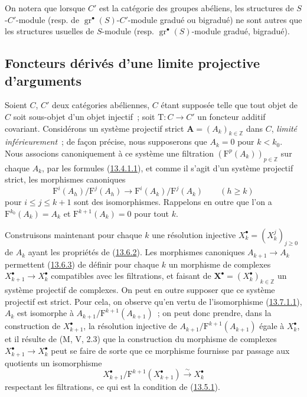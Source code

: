 \begin{env}[13.6.6]
On notera que lorsque $C'$ est la catégorie des groupes abéliens, les
structures de $S$-$C'$-module (resp. de
$\operatorname{gr}^\bullet(S)$-$C'$-module gradué ou bigradué) ne sont
autres que les structures usuelles de $S$-module (resp.
$\operatorname{gr}^\bullet(S)$-module gradué, bigradué).
\end{env}

\subsection{Foncteurs dérivés d'une limite projective d'arguments}
\label{subsection:0.13.7-fr}

\begin{env}[13.7.1]
\label{0.13.7.1-fr}
Soient $C$, $C'$ deux catégories abéliennes, $C$ étant supposée telle
que tout objet de $C$ soit sous-objet d'un objet injectif~; soit
$\mathrm T:C\to C'$ un foncteur additif covariant. Considérons un
système projectif strict $\mathbf A=(A_k)_{k\in\mathbb Z}$ dans $C$,
\emph{limité inférieurement}~; de façon précise, nous supposerons que
$A_k=0$ pour $k<k_0$. Nous associons canoniquement à ce système une
filtration $(\mathrm F^p(A_k))_{p\in\mathbb Z}$ sur chaque $A_k$, par les
formules (\hyperref[0.13.4.1.1-fr]{13.4.1.1}), et comme il s'agit d'un
système projectif strict, les morphismes canoniques
\begin{equation}
\label{0.13.7.1.1-fr}
\tag{13.7.1.1}
\mathrm F^i(A_h)/\mathrm F^j(A_h)\to
\mathrm F^i(A_k)/\mathrm F^j(A_k)\qquad(h\geq k)
\end{equation}
pour $i\leq j\leq k+1$ sont des isomorphismes. Rappelons en outre que
l'on a $\mathrm F^{k_0}(A_k)=A_k$ et $\mathrm F^{k+1}(A_k)=0$ pour tout
$k$.
\end{env}

\begin{env}[13.7.2]
\label{0.13.7.2-fr}
Construisons maintenant pour chaque $k$ une résolution injective
$X_k^\bullet=(X_k^j)_{j\geq0}$ de $A_k$ ayant les propriétés de
(\hyperref[0.13.6.2-fr]{13.6.2}). Les morphismes canoniques
$A_{k+1}\to A_k$ permettent
(\hyperref[0.13.6.3-fr]{13.6.3}) de définir pour chaque $k$ un morphisme
de complexes $X_{k+1}^\bullet\to X_k^\bullet$ compatibles avec les
filtrations, et faisant de
$\mathbf X^\bullet=(X_k^\bullet)_{k\in\mathbb Z}$ un système projectif
de complexes.
On peut en outre supposer que ce système projectif est strict. Pour
cela, on observe qu'en vertu de l'isomorphisme
(\hyperref[0.13.7.1.1-fr]{13.7.1.1}), $A_k$ est isomorphe à
$A_{k+1}/\mathrm F^{k+1}(A_{k+1})$~; on peut donc prendre, dans la
construction de $X_{k+1}^\bullet$, la résolution injective de
$A_{k+1}/\mathrm F^{k+1}(A_{k+1})$ égale à $X_k^\bullet$, et il résulte
de (M, V, 2.3) que la construction du morphisme de complexes
$X_{k+1}^\bullet\to X_k^\bullet$ peut se faire de sorte que ce morphisme
fournisse par passage aux quotients un isomorphisme
\[
X_{k+1}^\bullet/\mathrm F^{k+1}(X_{k+1}^\bullet)
\xrightarrow{\sim}X_k^\bullet
\]
respectant les filtrations, ce qui est la condition de
(\hyperref[0.13.5.1-fr]{13.5.1}).
\end{env}

